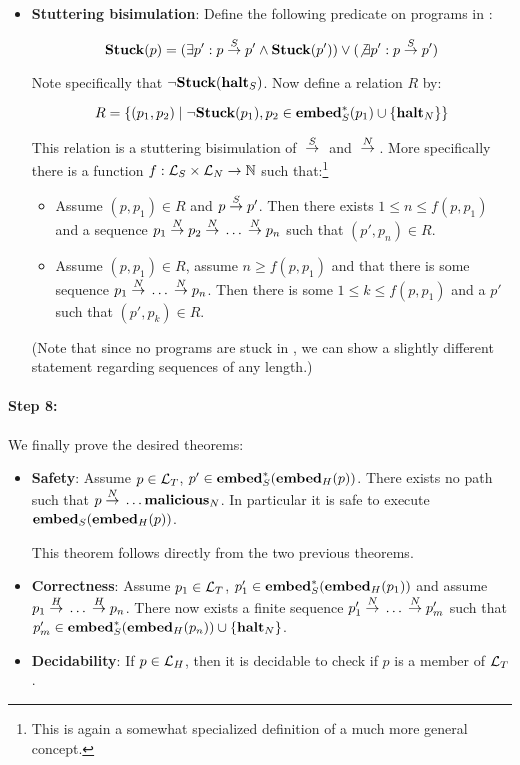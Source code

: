 \begin{itemize}
\item \textbf{Stuttering bisimulation}: Define the following predicate on
  programs in \simplelang:

  $$\mathbf{Stuck}(p) = (\exists p': p {{}\stackrel{S}{->}{}} p' \land \mathbf{Stuck}(p')) \lor (\not\exists p': p {{}\stackrel{S}{->}{}} p')$$

  Note specifically that $\neg\mathbf{Stuck}({\mathbf{halt}_S})$. Now define a relation $R$
  by:

  $$R = \{(p_1, p_2) \mid \neg\mathbf{Stuck}(p_1), p_2 \in {\ensuremath{\mathbf{embed}^\ast_S}}(p_1) \cup \{{\mathbf{halt}_N}\}\}$$

  This relation is a stuttering bisimulation of ${{}\stackrel{S}{->}{}}$ and
  ${{}\stackrel{N}{->}{}}$. More specifically there is a function
  $f : \mathcal{L}_S \times \mathcal{L}_N \to \mathbb{N}$ such that:\footnote{This is
    again a somewhat specialized definition of a much more general concept.}

  \begin{itemize}
  \item Assume $(p, p_1) \in R$ and $p {{}\stackrel{S}{->}{}} p'$. Then there exists
    $1 \leq n \leq f(p, p_1)$ and a sequence
    $p_1 {{}\stackrel{N}{->}{}} p_2 {{}\stackrel{N}{->}{}} \dots {{}\ensuremath{\stackrel{N}{->}}{}} p_n$ such that
    $(p', p_n) \in R$.
  \item Assume $(p, p_1) \in R$, assume $n \geq f(p, p_1)$ and that there is
    some sequence $p_1 {{}\stackrel{N}{->}{}} \dots {{}\ensuremath{\stackrel{N}{->}}{}} p_n$. Then there is some
    $1 \leq k \leq f(p, p_1)$ and a $p'$ such that $(p', p_k) \in R$.
  \end{itemize}

  (Note that since no programs are stuck in \nativelang, we can show a slightly
  different statement regarding sequences of any length.)
\end{itemize}

\paragraph{Step 8:} We finally prove the desired theorems:
\begin{itemize}
\item \textbf{Safety}: Assume $p \in \mathcal{L}_T$,
  $p' \in {\ensuremath{\mathbf{embed}^\ast_S}}({{\mathbf{embed}}_H}(p))$. There exists no path such that
  $p {{}\stackrel{N}{->}{}} \dots {\ensuremath{{\mathbf{malicious}}_N}}$. In particular it is safe to
  execute ${{\mathbf{embed}}_S}({{\mathbf{embed}}_H}(p))$.

  This theorem follows directly from the two previous theorems.

\item \textbf{Correctness}: Assume $p_1 \in \mathcal{L}_T$,
  $p_1' \in {\ensuremath{\mathbf{embed}^\ast_S}}({{\mathbf{embed}}_H}(p_1))$ and assume
  $p_1 {{}\stackrel{H}{->}{}} \dots {{}\ensuremath{\stackrel{H}{->}}{}} p_n$. There now exists a finite sequence
  $p_1' {{}\stackrel{N}{->}{}} \dots {{}\ensuremath{\stackrel{N}{->}}{}} p_m'$ such that
  $p_m' \in {\ensuremath{\mathbf{embed}^\ast_S}}({{\mathbf{embed}}_H}(p_n)) \cup \{{\mathbf{halt}_N}\}$.

\item \textbf{Decidability}: If $p \in \mathcal{L}_H$, then it is decidable to check
  if $p$ is a member of $\mathcal{L}_T$.
\end{itemize}

